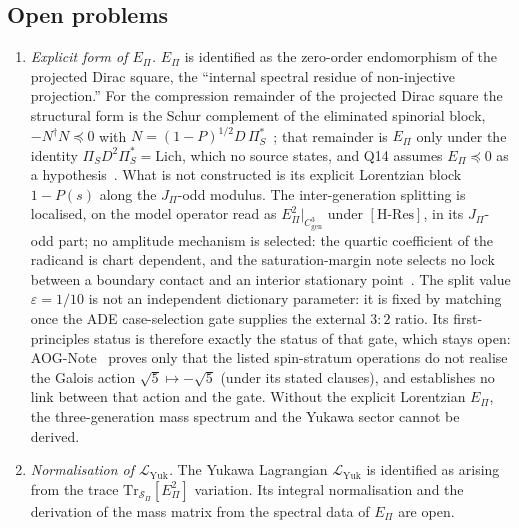 \documentclass[11pt,a4paper]{article}
\theoremstyle{definition}
\newcommand{\Sbundle}{\mathcal{S}_\Pi}
\newcommand{\Epi}{E_\Pi}
\newcommand{\Cgen}{C^3_{\mathrm{gen}}}
\newcommand{\HRes}{\ensuremath{[\mathrm{H\text{-}Res}]}}
\newcommand{\LYuk}{\mathcal{L}_{\mathrm{Yuk}}}
\begin{document}
    \subsection{Open problems}
      \label{sec:open-problems}

      \begin{enumerate}
        \item \textit{Explicit form of $\Epi$.}
        $\Epi$ is identified as the zero-order endomorphism of the projected Dirac square, the
        ``internal spectral residue of non-injective projection.''
        For the compression remainder of the projected Dirac square the structural form is the Schur complement of the
        eliminated spinorial block, $-N^{\dagger}N\preceq0$ with $N=(1-P)^{1/2}D\,\Pi_S^{*}$~\cite{Beau2026prs}; that
        remainder is $\Epi$ only under the identity $\Pi_S D^2\Pi_S^{*}=\mathrm{Lich}$, which no source states, and Q14
        assumes $\Epi\preceq0$ as a hypothesis~\cite{Beau2026q14}.
        What is not constructed is its explicit
        Lorentzian block $1-P(s)$ along the $J_\Pi$-odd modulus.
        The inter-generation splitting is localised, on the model operator read as $\Epi^2|_{\Cgen}$ under \HRes{},
        in its $J_\Pi$-odd part; no amplitude mechanism is selected: the quartic coefficient of the radicand is
        chart dependent, and the saturation-margin note selects no lock between a boundary contact and an interior
        stationary point~\cite{Beau2026bim}.
        The split value $\varepsilon=1/10$ is not an independent dictionary parameter: it is fixed by matching once
        the ADE case-selection gate supplies the external $3:2$ ratio.
        Its first-principles status is therefore exactly the status of that gate, which stays open: AOG-Note~\cite{Beau2026aog}
        proves only that the listed spin-stratum operations do not realise the Galois action
        $\sqrt{5}\mapsto-\sqrt{5}$ (under its stated clauses), and establishes no link between that action and the
        gate.
        Without the explicit Lorentzian $\Epi$, the three-generation mass spectrum and the Yukawa sector cannot be
        derived.

        \item \textit{Normalisation of $\LYuk$.}
        The Yukawa Lagrangian $\LYuk$ is identified as arising from the trace
        $\mathrm{Tr}_{\Sbundle}[\Epi^2]$ variation.
        Its integral normalisation and the derivation of the mass matrix from the spectral data
        of $\Epi$ are open.


\end{enumerate}
\end{document}
